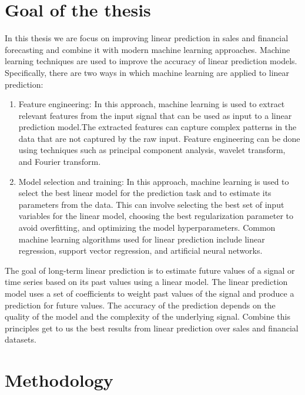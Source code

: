 \chapter{Goal of the thesis} \label{sec:goal}
In this thesis we are focus on improving linear prediction in sales and financial forecasting and combine it with modern machine learning approaches.
Machine learning techniques are used to improve the accuracy of linear prediction models.
Specifically, there are two ways in which machine learning are applied to linear prediction:
\begin{enumerate}
    \item Feature engineering: In this approach, machine learning is used to extract relevant features from the input signal that can be used as
    input to a linear prediction model.The extracted features can capture complex patterns in the data that are not captured by the raw input.
    Feature engineering can be done using techniques such as principal component analysis, wavelet transform, and Fourier transform.
    \item Model selection and training: In this approach, machine learning is used to select the best linear model for the prediction
     task and to estimate its parameters from the data. This can involve selecting the best set of input variables for the linear model,
     choosing the best regularization parameter to avoid overfitting, and optimizing the model hyperparameters. Common machine learning
     algorithms used for linear prediction include linear regression, support vector regression, and artificial neural networks.
\end{enumerate}
The goal of long-term linear prediction is to estimate future values of a signal or time series based on its past
values using a linear model.
The linear prediction model uses a set of coefficients to weight past values of the signal and produce a prediction for
future values. The accuracy of the prediction depends on the quality of the model and the complexity of the underlying signal.
Combine this principles get to us the best results from linear prediction over sales and financial datasets.
\chapter{Methodology} \label{sec:methodology}
